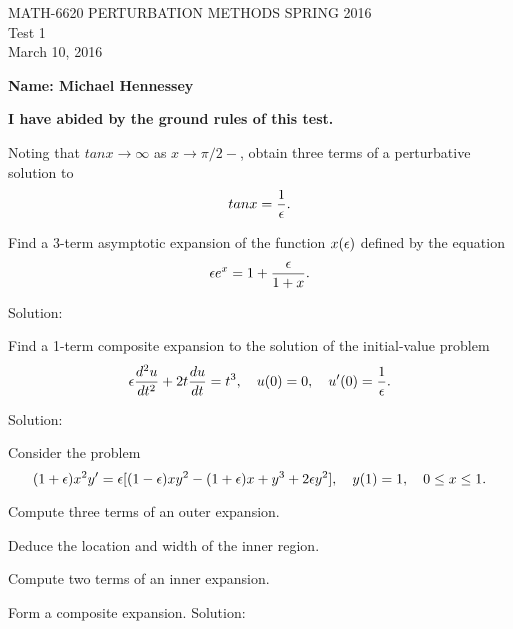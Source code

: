 


\begin{center}
\large{ MATH-6620 \hspace{1in}  PERTURBATION METHODS \hspace{1in}SPRING 2016\\ Test 1 \\ March 10, 2016}\end{center}


\vspace{6 ex}

{\bf Name: Michael Hennessey} \hfill

\vspace{6 ex}
\textbf{I have abided by the ground rules of this test.}
\vspace {6 ex}

 \ec

\benum
\item
\benum
\item Noting that $tan{x}\to\infty$ as $x\to \pi/2 -$, obtain three terms of a perturbative solution to 
$$tan{x}=\frac{1}{\epsilon}.$$

\item Find a 3-term asymptotic expansion of the function $x(\epsilon)$ defined by the equation
$$\epsilon e^x=1+\frac{\epsilon}{1+x}.$$
\eenum

Solution:\\

\benum
\item 

\item
\eenum

\item Find a 1-term composite expansion to the solution of the initial-value problem
$$\epsilon \frac{d^2u}{dt^2}+2t\frac{du}{dt}=t^3,\quad u(0)=0,\quad u'(0)=\frac{1}{\epsilon}.$$

Solution:\\

\item Consider the problem
$$(1+\epsilon)x^2y'=\epsilon[(1-\epsilon)xy^2-(1+\epsilon)x+y^3+2\epsilon y^2],\quad y(1)=1,\quad 0\leq x\leq 1.$$
\benum
\item Compute three terms of an outer expansion.
\item Deduce the location and width of the inner region.
\item Compute two terms of an inner expansion.
\item Form a composite expansion.
\eenum
Solution:\\

\benum
\item

\item 

\item 

\item 

\eenum
